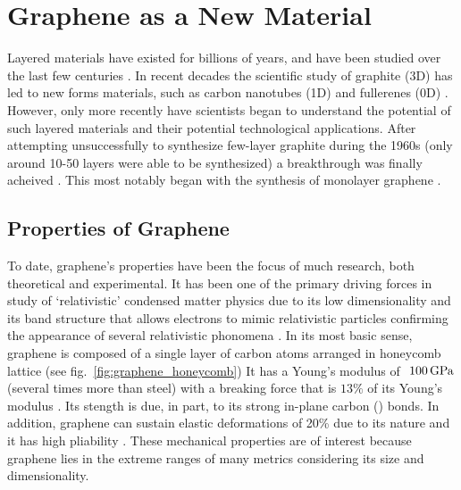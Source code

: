 \section{Graphene as a New \Td Material}\label{sec:graphene}
Layered materials have existed for billions of years, and have been studied over the last few centuries \cite{Golden_EarthSci2013,Brodie_Royal1859}. In recent decades the scientific study of graphite (3D) has led to new forms materials, such as carbon nanotubes (1D) and fullerenes (0D) \cite{Kroto_Nature1985, Balleste_Nanoscale2011,Iijima_Nature1991}. However, only more recently have scientists began to understand the potential of such layered materials and their potential technological applications. After attempting unsuccessfully to synthesize few-layer graphite during the 1960s (only around 10-50 layers were able to be synthesized) a breakthrough was finally acheived \cite{Balleste_Nanoscale2011}. This most notably began with the synthesis of monolayer graphene \cite{Novoselov_Science2004}.

\subsection{Properties of Graphene}\label{subsec:graphene_properties}
To date, graphene's properties have been the focus of much research, both theoretical and experimental. It has been one of the primary driving forces in study of `relativistic' condensed matter physics due to its low dimensionality and its band structure that allows electrons to mimic relativistic particles confirming the appearance of several relativistic phonomena \cite{Geim_NatureMat2007,Geim_Nature2005,Zhang_NatPhys2011,Williams_Science2007}. In its most basic sense, graphene is composed of a single layer of carbon atoms arranged in \td honeycomb lattice (see fig.~\ref{fig:graphene_honeycomb}) It has a Young's modulus of $~100\,\mathrm{GPa}$ (several times more than steel) with a breaking force that is $13\%$ of its Young's modulus \cite{Bertolazzi_ACSnano2011, Akinwande_NatureComm2014}. Its stength is due, in part, to its strong in-plane carbon () bonds. In addition, graphene can sustain elastic deformations of 20\% due to its \td nature and it has high pliability \cite{Balleste_Nanoscale2011}. These mechanical properties are of interest because graphene lies in the extreme ranges of many metrics considering its size and dimensionality.\\

